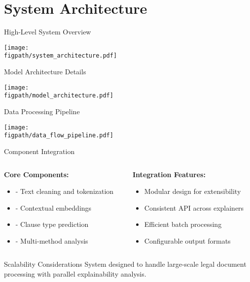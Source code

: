 
\section{System Architecture}

\begin{frame}{High-Level System Overview}
\begin{center}
\texttt{[image: \\figpath/system\_architecture.pdf]}
\end{center}
\end{frame}

\begin{frame}{Model Architecture Details}
\begin{center}
\texttt{[image: \\figpath/model\_architecture.pdf]}
\end{center}
\end{frame}

\begin{frame}{Data Processing Pipeline}
\begin{center}
\texttt{[image: \\figpath/data\_flow\_pipeline.pdf]}
\end{center}
\end{frame}

\begin{frame}{Component Integration}
\begin{columns}
\begin{column}{0.5\textwidth}
\textbf{Core Components:}
\begin{itemize}
    \item {} - Text cleaning and tokenization
    \item {} - Contextual embeddings
    \item {} - Clause type prediction
    \item {} - Multi-method analysis
\end{itemize}
\end{column}
\begin{column}{0.5\textwidth}
\textbf{Integration Features:}
\begin{itemize}
    \item Modular design for extensibility
    \item Consistent API across explainers
    \item Efficient batch processing
    \item Configurable output formats
\end{itemize}
\end{column}
\end{columns}

\vspace{0.5cm}
\begin{alertblock}{Scalability Considerations}
System designed to handle large-scale legal document processing with parallel explainability analysis.
\end{alertblock}
\end{frame}


